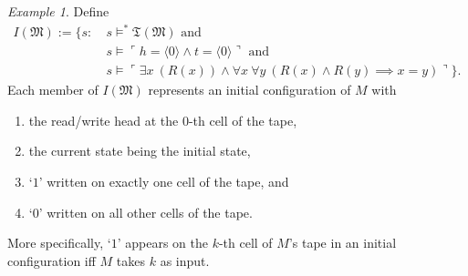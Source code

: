 \documentclass[12pt, twoside]{memoir}
\numberwithin{equation}{section}
\theoremstyle{definition}
\theoremstyle{remark}
\newtheorem{ex}[thm]{Example}
\theoremstyle{definition}
\theoremstyle{definition}
\theoremstyle{definition}
\theoremstyle{remark}
\begin{document}
\begin{ex}
Define 
\begin{align*}
    I(\mathfrak{M}) := \{s : \ & s \models^* \mathfrak{T}(\mathfrak{M}) \text{ and } \\
    & s \models \ulcorner h = \langle 0 \rangle \wedge t = \langle 0 \rangle \urcorner \text{ and } \\
    & s \models \ulcorner \exists x \ (R(x)) \wedge \forall x \ \forall y \ (R(x) \wedge R(y) \implies x = y) \urcorner\} \text{.}
\end{align*}
Each member of $I(\mathfrak{M})$ represents an initial configuration of $M$ with \begin{enumerate}[label=(\alph*)]
    \item the read/write head at the $0$-th cell of the tape, 
    \item the current state being the initial state, 
    \item `$1$' written on exactly one cell of the tape, and
    \item `$0$' written on all other cells of the tape.
\end{enumerate} 
More specifically, `$1$' appears on the $k$-th cell of $M$'s tape in an initial configuration iff $M$ takes $k$ as input.


\end{ex}
\end{document}
